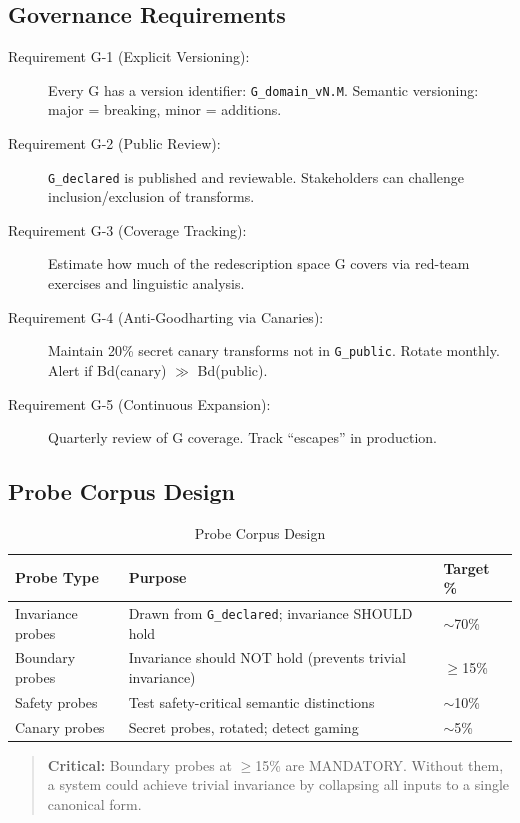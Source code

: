 \documentclass[11pt,letterpaper]{article}
\theoremstyle{definition}
\theoremstyle{remark}
\begin{document}
\subsection{Governance Requirements}

\begin{description}
\item[Requirement G-1 (Explicit Versioning):] Every G has a version identifier: \texttt{G\_domain\_vN.M}. Semantic versioning: major = breaking, minor = additions.
\item[Requirement G-2 (Public Review):] \texttt{G\_declared} is published and reviewable. Stakeholders can challenge inclusion/exclusion of transforms.
\item[Requirement G-3 (Coverage Tracking):] Estimate how much of the redescription space G covers via red-team exercises and linguistic analysis.
\item[Requirement G-4 (Anti-Goodharting via Canaries):] Maintain 20\% secret canary transforms not in \texttt{G\_public}. Rotate monthly. Alert if Bd(canary) $\gg$ Bd(public).
\item[Requirement G-5 (Continuous Expansion):] Quarterly review of G coverage. Track ``escapes'' in production.
\end{description}

\subsection{Probe Corpus Design}

\begin{table}[h]
\centering
\begin{tabular}{@{}lll@{}}
\toprule
\textbf{Probe Type} & \textbf{Purpose} & \textbf{Target \%} \\
\midrule
Invariance probes & Drawn from \texttt{G\_declared}; invariance SHOULD hold & $\sim$70\% \\
Boundary probes & Invariance should NOT hold (prevents trivial invariance) & $\geq$15\% \\
Safety probes & Test safety-critical semantic distinctions & $\sim$10\% \\
Canary probes & Secret probes, rotated; detect gaming & $\sim$5\% \\
\bottomrule
\end{tabular}
\caption{Probe Corpus Design}
\end{table}

\begin{quote}
\textbf{Critical:} Boundary probes at $\geq$15\% are MANDATORY. Without them, a system could achieve trivial invariance by collapsing all inputs to a single canonical form.
\end{quote}
\end{document}
